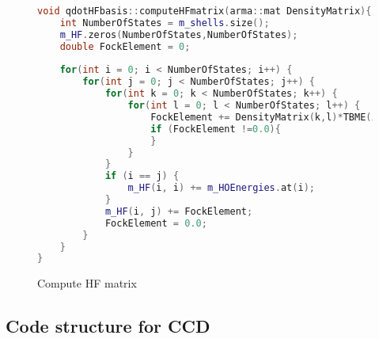 \documentclass[twoside,english]{uiofysmaster}
\theoremstyle{definition}
\begin{document}
\begin{figure}
\begin{lstlisting}[language=C++]
void qdotHFbasis::computeHFmatrix(arma::mat DensityMatrix){
	int NumberOfStates = m_shells.size();
	m_HF.zeros(NumberOfStates,NumberOfStates);
	double FockElement = 0;
	
	for(int i = 0; i < NumberOfStates; i++) {
		for(int j = 0; j < NumberOfStates; j++) {
			for(int k = 0; k < NumberOfStates; k++) {
				for(int l = 0; l < NumberOfStates; l++) {
					FockElement += DensityMatrix(k,l)*TBME(i,k,j,l);
					if (FockElement !=0.0){
					}
				}
			}
			if (i == j) {
				m_HF(i, i) += m_HOEnergies.at(i);
			}
			m_HF(i, j) += FockElement;
			FockElement = 0.0;
		}
	}
}
\end{lstlisting}
\caption{Compute HF matrix}
\end{figure}
\subsection{Code structure for CCD}
\end{document}
